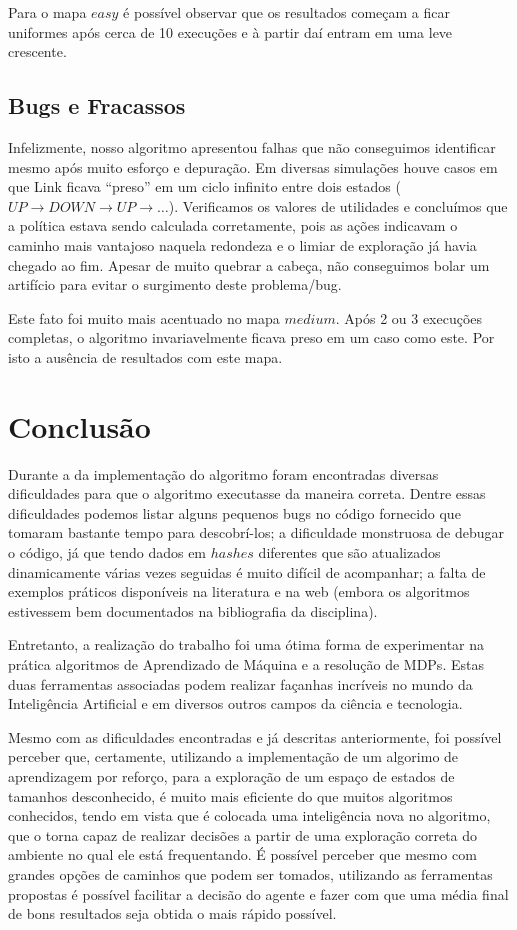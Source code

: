 \documentclass[letterpaper]{article}
\begin{document}
Para o mapa $easy$ é possível observar que os resultados começam a ficar uniformes após cerca de 10 execuções e à partir daí entram em uma leve crescente.

\subsection{Bugs e Fracassos}

Infelizmente, nosso algoritmo apresentou falhas que não conseguimos identificar mesmo após muito esforço e depuração. Em diversas simulações houve casos
em que Link ficava ``preso'' em um ciclo infinito entre dois estados ($UP \rightarrow DOWN \rightarrow UP \rightarrow \ldots$). Verificamos os valores de
utilidades e concluímos que a política estava sendo calculada corretamente, pois as ações indicavam o caminho mais vantajoso naquela redondeza e o limiar
de exploração já havia chegado ao fim. Apesar de muito quebrar a cabeça, não conseguimos bolar um artifício para evitar o surgimento deste problema/bug.

Este fato foi muito mais acentuado no mapa $medium$. Após 2 ou 3 execuções completas, o algoritmo invariavelmente ficava preso em um caso como este. Por
isto a ausência de resultados com este mapa.

\section{Conclusão}

Durante a da implementação do algoritmo foram encontradas diversas dificuldades para que o algoritmo executasse da maneira correta. Dentre essas dificuldades
podemos listar alguns pequenos bugs no código fornecido que tomaram bastante tempo para descobrí-los; a dificuldade monstruosa de debugar o código, já que
tendo dados em $hashes$ diferentes que são atualizados dinamicamente várias vezes seguidas é muito difícil de acompanhar; a falta de exemplos práticos disponíveis
na literatura e na web (embora os algoritmos estivessem bem documentados na bibliografia da disciplina).

Entretanto, a realização do trabalho foi uma ótima forma de experimentar na prática algoritmos de Aprendizado de Máquina e a resolução de MDPs. Estas duas
ferramentas associadas podem realizar façanhas incríveis no mundo da Inteligência Artificial e em diversos outros campos da ciência e tecnologia.

Mesmo com as dificuldades encontradas e já descritas anteriormente, foi possível perceber que, certamente, utilizando a implementação de um algorimo de aprendizagem por reforço, para a exploração de um espaço de estados de tamanhos desconhecido, é muito mais eficiente do que muitos algoritmos conhecidos, tendo em vista que é colocada uma inteligência nova no algoritmo, que o torna capaz de realizar decisões a partir de uma exploração correta do ambiente no qual ele está frequentando. É possível perceber que mesmo com grandes opções de caminhos que podem ser tomados, utilizando as ferramentas propostas é possível facilitar a decisão do agente e fazer com que uma média final de bons resultados seja obtida o mais rápido possível. 
\end{document}
